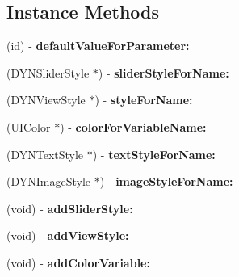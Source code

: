 \subsection*{Instance Methods}
\begin{DoxyCompactItemize}
\item 
\hypertarget{interface_d_y_n_manager_a3a8d25f955f5b9d7d638ec3e8212ca4c}{(id) -\/ {\bfseries default\-Value\-For\-Parameter\-:}}\label{interface_d_y_n_manager_a3a8d25f955f5b9d7d638ec3e8212ca4c}

\item 
\hypertarget{interface_d_y_n_manager_adb9805e782c43b72814d6cf95faab68d}{(D\-Y\-N\-Slider\-Style $\ast$) -\/ {\bfseries slider\-Style\-For\-Name\-:}}\label{interface_d_y_n_manager_adb9805e782c43b72814d6cf95faab68d}

\item 
\hypertarget{interface_d_y_n_manager_a6ff42d91c6add5196fd4c020541d66e2}{(D\-Y\-N\-View\-Style $\ast$) -\/ {\bfseries style\-For\-Name\-:}}\label{interface_d_y_n_manager_a6ff42d91c6add5196fd4c020541d66e2}

\item 
\hypertarget{interface_d_y_n_manager_a272bdc91a833adb3737bcca52f5e5d7d}{(U\-I\-Color $\ast$) -\/ {\bfseries color\-For\-Variable\-Name\-:}}\label{interface_d_y_n_manager_a272bdc91a833adb3737bcca52f5e5d7d}

\item 
\hypertarget{interface_d_y_n_manager_a4eb5eba484c8b25dafd65c6cec0666fa}{(D\-Y\-N\-Text\-Style $\ast$) -\/ {\bfseries text\-Style\-For\-Name\-:}}\label{interface_d_y_n_manager_a4eb5eba484c8b25dafd65c6cec0666fa}

\item 
\hypertarget{interface_d_y_n_manager_ad019d24c52409c87dbcb17964192e942}{(D\-Y\-N\-Image\-Style $\ast$) -\/ {\bfseries image\-Style\-For\-Name\-:}}\label{interface_d_y_n_manager_ad019d24c52409c87dbcb17964192e942}

\item 
\hypertarget{interface_d_y_n_manager_ab0651f61a621cc93083838e8ac210c74}{(void) -\/ {\bfseries add\-Slider\-Style\-:}}\label{interface_d_y_n_manager_ab0651f61a621cc93083838e8ac210c74}

\item 
\hypertarget{interface_d_y_n_manager_aeffbc6f7e4851f914867a64bd063565e}{(void) -\/ {\bfseries add\-View\-Style\-:}}\label{interface_d_y_n_manager_aeffbc6f7e4851f914867a64bd063565e}

\item 
\hypertarget{interface_d_y_n_manager_a2e736193c64f14d5f34744de5a6171e9}{(void) -\/ {\bfseries add\-Color\-Variable\-:}}\label{interface_d_y_n_manager_a2e736193c64f14d5f34744de5a6171e9}


\end{DoxyCompactItemize}
